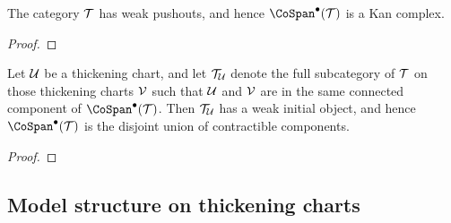 \begin{remark}
\end{remark}

\begin{prop}\label{weak-pullback-charts}
The category $\mathcal T$ has weak pushouts, and hence $\CoSpan^\bullet(\cT)$ is a Kan complex. 
\end{prop}

\begin{proof}
\jake{[To be done.]}
\end{proof}

\begin{prop}\label{weak-initial-charts}
Let $\mathcal U$ be a thickening chart, and let $\mathcal T_\mathcal U$ denote the full subcategory of $\mathcal T$ on those thickening charts $\mathcal V$ such that $\mathcal U$ and $\mathcal V$ are in the same connected component of $\CoSpan^\bullet(\cT)$. Then $\mathcal T_\mathcal U$ has a weak initial object, and hence $\CoSpan^\bullet(\cT)$ is the disjoint union of contractible components. 
\end{prop}

\begin{proof}
\jake{[To be done.]}
\end{proof}

\subsection{Model structure on thickening charts}

